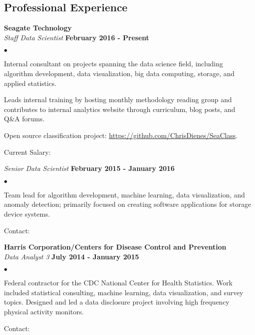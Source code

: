 \documentclass[margin,line]{res}
\newenvironment{list2}{
  \begin{list}{$\bullet$}{%
      \setlength{\itemsep}{0in}
      \setlength{\parsep}{0in} \setlength{\parskip}{0in}
      \setlength{\topsep}{0in} \setlength{\partopsep}{0in}
      \setlength{\leftmargin}{0.2in}}}{\end{list}}
\begin{document}
\begin{resume}
\section{\sc Professional Experience}
{\bf Seagate Technology}\\

\vspace{-.75cm}
{\em Staff Data Scientist} \hfill {\bf February 2016 - Present}\\
\begin{list2}
\item Internal consultant on projects spanning the data science field, including algorithm development, data visualization, big data computing, storage, and applied statistics.\\[-.25cm]
\item Leads internal training by hosting monthly methodology reading group and contributes to internal analytics website through curriculum, blog posts, and Q\&A forums.\\[-.25cm]
\item Open source classification project: \url{https://github.com/ChrisDienes/SeaClass}. \\[-.25cm] 
\item Current Salary: 
\end{list2}
{\em Senior Data Scientist} \hfill {\bf February 2015 - January 2016}\\
\begin{list2}
\item Team lead for algorithm development, machine learning, data visualization, and anomaly detection; primarily focused on creating software applications for storage device systems.\\[-.25cm]
\item Contact: 
\end{list2}

{\bf Harris Corporation/Centers for Disease Control and Prevention}\\

\vspace{-.75cm}
{\em Data Analyst 3} \hfill {\bf July 2014 - January 2015}\\
\begin{list2}
\item Federal contractor for the CDC National Center for Health Statistics. Work included statistical consulting, machine learning, data visualization, and survey topics. Designed and led a data disclosure project involving high frequency physical activity monitors.\\[-.25cm]
\item Contact: 
\end{list2}


\end{resume}
\end{document}
